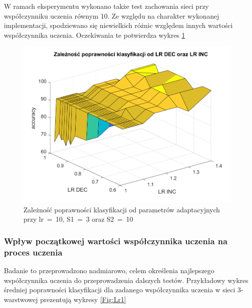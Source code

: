 \documentclass[12pt,twoside]{article}
\begin{document}
W ramach eksperymentu wykonano także test zachowania sieci przy współczynniku uczenia równym 10.
Ze względu na charakter wykonanej implementacji, spodziewano się niewielkich różnic względem innych wartości współczynnika uczenia.
Oczekiwania te potwierdza wykres \ref{Fig:IncDecHigh}
\begin{figure}[ht]
	\centering
	\includegraphics[width=16cm]{figures/IncDec_High.png}
	\caption{Zależność poprawności klasyfikacji od parametrów adaptacyjnych przy lr~=~10, S1~=~3 oraz S2~=~10}
	\label{Fig:IncDecHigh}
\end{figure}

\clearpage
\subsubsection{Wpływ początkowej wartości współczynnika uczenia na proces uczenia}
Badanie to przeprowadzono nadmiarowo, celem określenia najlepszego współczynnika uczenia do przeprowadzenia dalszych testów.
Przykładowy wykres średniej poprawności klasyfikacji dla zadanego współczynnika uczenia w sieci 3-warstwowej prezentują wykresy \ref{Fig:Lr1}
\end{document}
